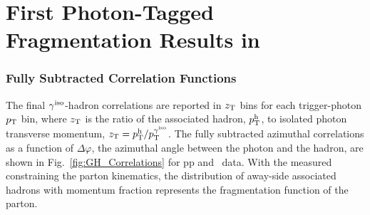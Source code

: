 \chapter{First Photon-Tagged Fragmentation Results in \pPb}

\subsection{Fully Subtracted Correlation Functions}
\label{sec:decaybkgsubtraction}
The final $ \gamma^\mathrm{iso}$-hadron correlations are reported in $z_{\mathrm{T}}$  bins for each trigger-photon $p_{\mathrm{T}}$ bin, where $z_{\mathrm{T}}$ is the ratio of the associated hadron, $p_{\mathrm{T}}^\mathrm{h}$, to isolated photon transverse momentum, $z_{\mathrm{T}} = p_{\mathrm{T}}^{\mathrm{h}}/p_{\mathrm{T}}^{\gamma^\mathrm{iso}}$. The fully subtracted azimuthal correlations as a function of $ \Delta\varphi$, the azimuthal angle between the photon and the hadron, are shown in Fig.~\ref{fig:GH_Correlations} for pp and \pPb~data. With the measured \gammaiso~ constraining the parton kinematics, the distribution of away-side associated hadrons with momentum fraction \zt represents the fragmentation function of the parton.

